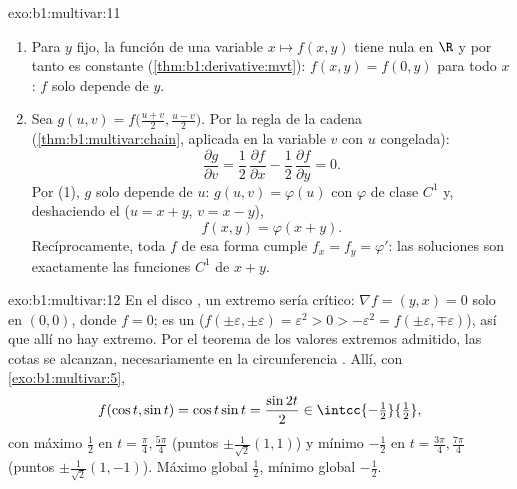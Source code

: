 \begin{solution}{exo:b1:multivar:11}
\begin{enumerate}
  \item Para $y$ fijo, la función de una variable $x \mapsto
        f(x,y)$ tiene  nula en $\R$ y por tanto es constante
        (\cref{thm:b1:derivative:mvt}): $f(x, y) = f(0, y)$ para
        todo $x$: $f$ solo depende de $y$.
  \item Sea $g(u, v) = f\bigl(\frac{u+v}2, \frac{u-v}2\bigr)$.
        Por la regla de la cadena (\cref{thm:b1:multivar:chain}, aplicada
        en la variable $v$ con $u$ congelada):
        \[
        \frac{\partial g}{\partial v}
        = \frac12\,\frac{\partial f}{\partial x}
        - \frac12\,\frac{\partial f}{\partial y} = 0 .
        \]
        Por (1), $g$ solo depende de $u$: $g(u, v) = \varphi(u)$
        con $\varphi$ de clase $C^1$ y, deshaciendo el  ($u = x + y$, $v = x - y$),
        \[
        f(x, y) = \varphi(x + y).
        \]
        Recíprocamente, toda $f$ de esa forma cumple $f_x = f_y =
        \varphi'$: las soluciones son exactamente las funciones $C^1$
        de $x + y$.
\end{enumerate}
\end{solution}

\begin{solution}{exo:b1:multivar:12}
En el disco , un extremo sería crítico: $\nabla f = (y,
x) = 0$ solo en $(0,0)$, donde $f = 0$; es un  ($f(\pm
\varepsilon, \pm\varepsilon) = \varepsilon^2 > 0 > -\varepsilon^2
= f(\pm\varepsilon, \mp\varepsilon)$), así que allí no hay extremo. Por
el teorema de los valores extremos admitido, las cotas se alcanzan,
necesariamente en la circunferencia . Allí, con
\cref{exo:b1:multivar:5},
\[
f(\cos t, \sin t) = \cos t\sin t = \frac{\sin 2t}{2}
\in \intcc{-\tfrac12}{\tfrac12},
\]
con máximo $\frac12$ en $t = \frac\pi4, \frac{5\pi}4$ (puntos
$\pm\frac{1}{\sqrt2}(1,1)$) y mínimo $-\frac12$ en $t =
\frac{3\pi}4, \frac{7\pi}4$ (puntos $\pm\frac{1}{\sqrt2}(1,-1)$).
Máximo global $\frac12$, mínimo global $-\frac12$.
\end{solution}

